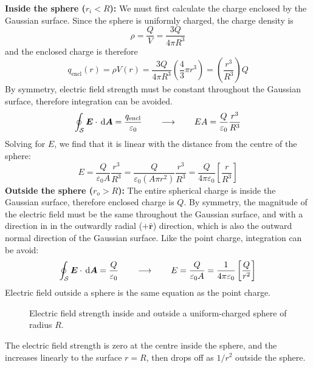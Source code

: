 \textbf{Inside the sphere ($r_i<R$):} We must first calculate the charge
enclosed by the Gaussian surface. Since the sphere is uniformly charged, the
charge density is
\begin{equation*}
  \rho=\frac QV=\frac{3Q}{4\pi R^3}
\end{equation*}
and the enclosed charge is therefore
\begin{equation*}
  q_\text{encl}(r)=\rho V(r)=\frac{3Q}{4\pi R^3}\left(\frac43\pi r^3\right)
  =\left(\frac{r^3}{R^3}\right)Q
\end{equation*}
By symmetry, electric field strength must be constant throughout the
Gaussian surface, therefore integration can be avoided. 
\begin{equation*}
  \oint_{\mathcal S}\bm E\cdot\dl{\bm A}=\frac{q_\text{encl}}{\varepsilon_0}
  \quad\quad\longrightarrow\quad\quad EA=\frac Q{\varepsilon_0}\frac{r^3}{R^3}
\end{equation*}
Solving for $E$, we find that it is linear with the distance from the centre
of the sphere:
\begin{equation*}
  E=\frac Q{\varepsilon_0A}\frac{r^3}{R^3}
  =\frac Q{\varepsilon_0(A\pi r^2)}\frac{r^3}{R^3}
  =\frac Q{4\pi\varepsilon_0}\left[\frac r{R^3}\right]
\end{equation*}
\textbf{Outside the sphere ($r_o>R$):} The entire spherical charge is inside the
Gaussian surface, therefore enclosed charge is $Q$. By symmetry, the
magnitude of the electric field must be the same throughout the Gaussian
surface, and with a direction in in the outwardly radial ($+\hat{\bm r}$)
direction, which is also the outward normal direction of the Gaussian surface.
Like the point charge, integration can be avoid:
\begin{equation}
  \oint_{\mathcal S}\bm E\cdot\dl{\bm A}=\frac Q{\varepsilon_0}
  \quad\quad\longrightarrow\quad\quad E=\frac Q{\varepsilon_0A}
  =\frac1{4\pi\varepsilon_0}\left[\frac Q{r^2}\right]
\end{equation}
Electric field outside a sphere is the same equation as the point charge.

\begin{figure}[ht]
  \centering
  \caption{Electric field strength inside and outside a uniform-charged sphere
    of radius $R$.}
  \label{fig:E-sphere}
\end{figure}
The electric field strength is zero at the centre inside the sphere, and
the increases linearly to the surface $r=R$, then drops off as $1/r^2$ outside
the sphere.


